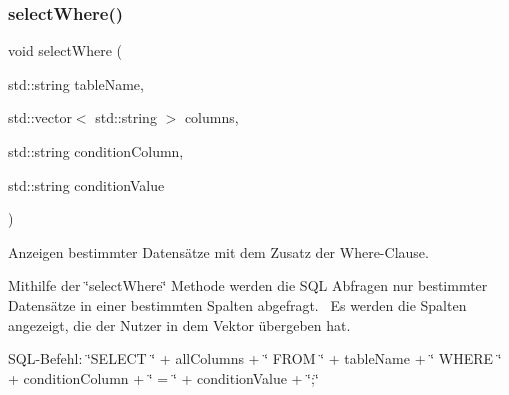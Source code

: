 \subsubsection{select\+Where()}
{\footnotesize\ttfamily void select\+Where (\begin{DoxyParamCaption}\item[{std\+::string}]{table\+Name,  }\item[{std\+::vector$<$ std\+::string $>$}]{columns,  }\item[{std\+::string}]{condition\+Column,  }\item[{std\+::string}]{condition\+Value }\end{DoxyParamCaption})}



Anzeigen bestimmter Datensätze mit dem Zusatz der Where-\/\+Clause. 

Mithilfe der \char`\"{}select\+Where\char`\"{} Methode werden die S\+QL Abfragen nur bestimmter Datensätze in einer bestimmten Spalten abgefragt.~\newline
 Es werden die Spalten angezeigt, die der Nutzer in dem Vektor übergeben hat.~\newline


S\+Q\+L-\/\+Befehl\+: \char`\"{}\+S\+E\+L\+E\+C\+T \char`\"{} + all\+Columns + \char`\"{} F\+R\+O\+M \char`\"{} + table\+Name + \char`\"{} W\+H\+E\+R\+E \char`\"{} + condition\+Column + \char`\"{} = \textquotesingle{}\char`\"{} + condition\+Value + \char`\"{}\textquotesingle{};\char`\"{}


